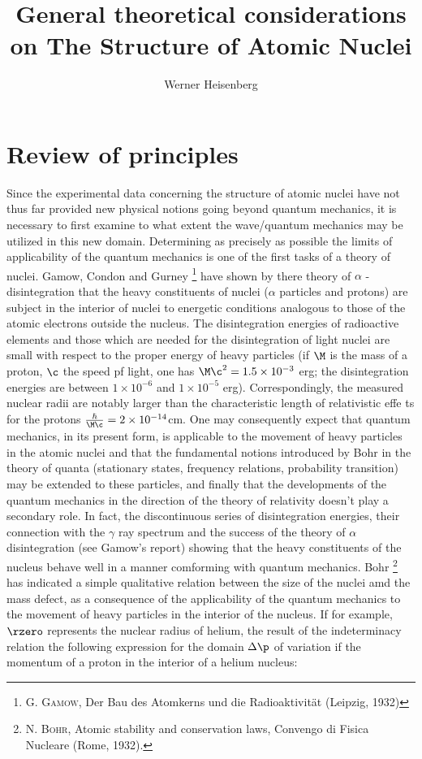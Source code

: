 \documentclass{article}
\newcommand{\ee}[2]{{{#1}\times 10^{#2}}}
\begin{document}
\title{General theoretical considerations on The Structure of Atomic Nuclei}
\author{Werner Heisenberg}
\maketitle
\tableofcontents
\section{Review of principles}
Since the experimental data concerning the structure of atomic nuclei have not thus far provided new physical notions going beyond quantum mechanics, it is necessary to first examine to what extent the wave/quantum mechanics may be utilized in this new domain. Determining as precisely
 as possible the limits of applicability of the quantum mechanics is one of the first tasks of a theory of nuclei.
Gamow, Condon and Gurney \footnote{\textsc{G. Gamow}, Der Bau des Atomkerns und die Radioaktivität (Leipzig, 1932)} have shown by there theory of $\alpha$ -disintegration that the heavy constituents of nuclei ($\alpha$ particles and protons) are subject in the interior of nuclei to energetic conditions analogous to those of the atomic electrons outside the nucleus. The disintegration energies of radioactive elements and those which are needed for the disintegration of light nuclei are small with respect to the proper energy of heavy particles (if $\M$ is the mass of a proton, $\c$ the speed pf light, one has $\M\c^2 = \ee{1.5}{-3}$ erg; the disintegration energies are between $\ee{1}{-6}$ and $\ee{1}{-5}$ erg). Correspondingly, the measured nuclear radii are notably larger than the characteristic length of relativistic effe ts for the protons $\frac{\hbar}{\M\c} = \ee{2}{-14}$cm. One may consequently expect that quantum mechanics, in its present form, is applicable to the movement of heavy particles in the atomic nuclei and that the fundamental notions introduced by Bohr in the theory of quanta (stationary states, frequency relations, probability transition) may be extended to these particles, and finally that the developments of the quantum mechanics in the direction of the theory of relativity doesn't play a secondary role. In fact, the discontinuous series of disintegration energies, their connection with the $\gamma$ ray spectrum and the success of the theory of $\alpha$ disintegration (see Gamow's report) showing that the heavy constituents of the nucleus behave well in a manner comforming with quantum mechanics.
Bohr \footnote{\textsc{N. Bohr}, Atomic stability and conservation laws, Convengo di Fisica Nucleare (Rome, 1932).} has indicated a simple qualitative relation between the size of the nuclei amd the mass defect, as a consequence of the applicability of the quantum mechanics to the movement of heavy particles in the interior of the nucleus. If for example, $\rzero$ represents the nuclear radius of helium, the result of the indeterminacy relation the following expression for the domain $\Delta\p$ of variation if the momentum of a proton in the interior of a helium nucleus:
\end{document}
